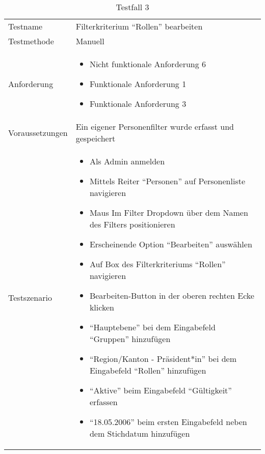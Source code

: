 \newpage

\begin{table}[h!]
   \begin{tabular}{|L{0.4\textwidth}|L{0.6\textwidth}|}
       \hline
         \\[12pt]
       \hline
        Testname & Filterkriterium ``Rollen'' bearbeiten \\
       \hline
       Testmethode & Manuell \\
       \hline
        Anforderung & 
        \begin{itemize}
         \item Nicht funktionale Anforderung 6
         \item Funktionale Anforderung 1
         \item Funktionale Anforderung 3
         \end{itemize}  \\
       \hline
       Voraussetzungen & Ein eigener Personenfilter wurde erfasst und gespeichert \\
       \hline
       Testszenario & 
       \begin{itemize}
         \item Als Admin anmelden
         \item Mittels Reiter ``Personen'' auf Personenliste navigieren
         \item Maus Im Filter Dropdown über dem Namen des Filters positionieren
         \item Erscheinende Option ``Bearbeiten'' auswählen
         \item Auf Box des Filterkriteriums ``Rollen'' navigieren
         \item Bearbeiten-Button in der oberen rechten Ecke klicken
         \item ``Hauptebene'' bei dem Eingabefeld ``Gruppen'' hinzufügen
         \item ``Region/Kanton - Präsident*in'' bei dem Eingabefeld ``Rollen'' hinzufügen
         \item ``Aktive'' beim Eingabefeld ``Gültigkeit'' erfassen
         \item ``18.05.2006'' beim ersten Eingabefeld neben dem Stichdatum hinzufügen
       \end{itemize} \\
      \hline
     \end{tabular}
     \caption{Testfall 3}
\end{table}

